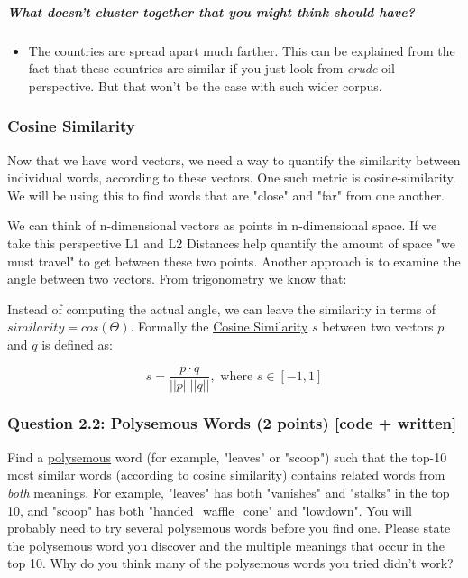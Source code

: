 \documentclass[11pt]{article}
\providecommand{\tightlist}{%
      \setlength{\itemsep}{0pt}\setlength{\parskip}{0pt}}
\begin{document}
\subparagraph{What doesn't cluster together that you might think should
have?}\label{what-doesnt-cluster-together-that-you-might-think-should-have}

\begin{itemize}
\tightlist
\item
  The countries are spread apart much farther. This can be explained
  from the fact that these countries are similar if you just look from
  \emph{crude} oil perspective. But that won't be the case with such
  wider corpus.
\end{itemize}

    \subsubsection{Cosine Similarity}\label{cosine-similarity}

Now that we have word vectors, we need a way to quantify the similarity
between individual words, according to these vectors. One such metric is
cosine-similarity. We will be using this to find words that are "close"
and "far" from one another.

We can think of n-dimensional vectors as points in n-dimensional space.
If we take this perspective L1 and L2 Distances help quantify the amount
of space "we must travel" to get between these two points. Another
approach is to examine the angle between two vectors. From trigonometry
we know that:

Instead of computing the actual angle, we can leave the similarity in
terms of \(similarity = cos(\Theta)\). Formally the
\href{https://en.wikipedia.org/wiki/Cosine_similarity}{Cosine
Similarity} \(s\) between two vectors \(p\) and \(q\) is defined as:

\[s = \frac{p \cdot q}{||p|| ||q||}, \textrm{ where } s \in [-1, 1] \]

    \subsubsection{Question 2.2: Polysemous Words (2 points) {[}code +
written{]}}\label{question-2.2-polysemous-words-2-points-code-written}

Find a \href{https://en.wikipedia.org/wiki/Polysemy}{polysemous} word
(for example, "leaves" or "scoop") such that the top-10 most similar
words (according to cosine similarity) contains related words from
\emph{both} meanings. For example, "leaves" has both "vanishes" and
"stalks" in the top 10, and "scoop" has both "handed\_waffle\_cone" and
"lowdown". You will probably need to try several polysemous words before
you find one. Please state the polysemous word you discover and the
multiple meanings that occur in the top 10. Why do you think many of the
polysemous words you tried didn't work?
\end{document}
